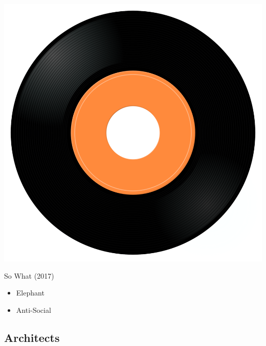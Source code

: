 \begin{minipage}[t]{0.25\textwidth}\vspace{0pt}
\captionsetup{type=figure}
\includegraphics[width=\textwidth]{Images/cover.png}
\caption*{So What (2017)}
\end{minipage}
\begin{minipage}[t]{0.25\textwidth}\vspace{0pt}
\begin{itemize}[nosep,leftmargin=1em,labelwidth=*,align=left]
	\setlength{\itemsep}{0pt}
	\item Elephant
	\item Anti-Social
\end{itemize}
\end{minipage}

\subsection{Architects}

